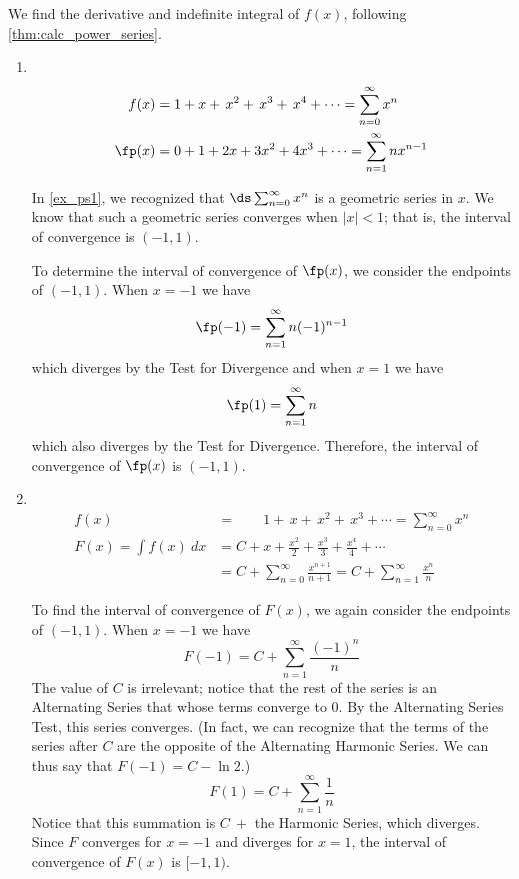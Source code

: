 {We find the derivative and indefinite integral of $f(x)$, following \autoref{thm:calc_power_series}.

\begin{enumerate}
\item\mbox{}\\[-3\baselineskip]
\begin{align*}
f(x)&=1+x+\,x^2+\,x^3+\,x^4+\dotsb = \sum_{n=0}^\infty x^n\\
\fp(x) &= 0+1+2x+3x^2+4x^3+\dotsb=\sum_{n=1}^\infty nx^{n-1} 
\end{align*}

In \autoref{ex_ps1}, we recognized that $\ds \sum_{n=0}^\infty x^n$ is a geometric series in $x$. We know that such a geometric series converges when $|x|<1$; that is, the interval of convergence is $(-1,1)$.

To determine the interval of convergence of $\fp(x)$, we consider the endpoints of $(-1,1)$.
When $x=-1$ we have $$\fp(-1) = \sum_{n=1}^\infty n(-1)^{n-1}$$
which diverges by the Test for Divergence
and when $x=1$ we have
$$\fp(1) = \sum_{n=1}^\infty n$$
which also diverges by the Test for Divergence. Therefore, the interval of convergence of $\fp(x)$ is $(-1,1)$. 

\item\mbox{}\\[-3\baselineskip]
\begin{align*}
 f(x)&=\phantom{C+{}}1+\,x+\,x^2+\,x^3+\dotsb = \sum_{n=0}^\infty x^n\\
 F(x) = \int f(x)\ dx &= C+ x+\frac{x^2}{2}+\frac{x^3}3+\frac{x^4}4+\dotsb \\
 &= C+\sum_{n=0}^\infty \frac{x^{n+1}}{n+1}=C+\sum_{n=1}^\infty \frac{x^{n}}{n}  
\end{align*}

To find the interval of convergence of $F(x)$, we again consider the endpoints of $(-1,1)$.
When $x=-1$ we have
$$F(-1) = C+\sum_{n=1}^\infty \frac{(-1)^{n}}{n}$$
The value of $C$ is irrelevant; notice that the rest of the series is an Alternating Series that whose terms converge to 0. By the Alternating Series Test, this series converges. (In fact, we can recognize that the terms of the series after $C$ are the opposite of the Alternating Harmonic Series. We can thus say that $F(-1) = C-\ln 2$.)
$$F(1) = C+\sum_{n=1}^\infty \frac{1}{n} $$
Notice that this summation is $C\ +$ the Harmonic Series, which diverges. Since $F$ converges for $x=-1$ and diverges for $x=1$, the interval of convergence of $F(x)$ is $[-1,1)$.\eoehere
\end{enumerate}}

